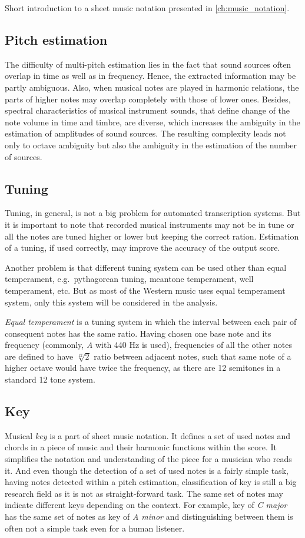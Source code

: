 Short introduction to a sheet music notation presented in \cref{ch:music_notation}.

\subsection{Pitch estimation}\label{subsec:pitch-estimation}
The difficulty of multi-pitch estimation lies in the fact that sound sources often overlap in time as well as in
frequency. Hence, the extracted information may be partly ambiguous. Also, when musical notes are played in harmonic
relations, the parts of higher notes may overlap completely with those of lower ones. Besides, spectral characteristics
of musical instrument sounds, that define change of the note volume in time and timbre, are diverse, which increases
the ambiguity in the estimation of amplitudes of sound sources. The resulting complexity leads not only to octave
ambiguity but also the ambiguity in the estimation of the number of sources.

\subsection{Tuning}\label{subsec:tuning}
Tuning, in general, is not a big problem for automated transcription systems. But it is important to note that recorded
musical instruments may not be in tune or all the notes are tuned higher or lower but keeping the correct ration.
Estimation of a tuning, if used correctly, may improve the accuracy of the output score.

Another problem is that different tuning system can be used other than equal temperament, e.g.\ pythagorean tuning,
meantone temperament, well temperament, etc. But as most of the Western music uses equal temperament system, only this
system will be considered in the analysis.

\textit{Equal temperament} is a tuning system in which the interval between each pair of consequent notes has the same
ratio. Having chosen one base note and its frequency (commonly, \textit{A} with 440 Hz is used), frequencies of all
the other notes are defined to have $\sqrt[12]{2}$ ratio between adjacent notes, such that same note of a higher octave
would have twice the frequency, as there are 12 semitones in a standard 12 tone system.


\subsection{Key}\label{subsec:key}
Musical \textit{key} is a part of sheet music notation. It defines a set of used notes and chords in a piece of music
and their harmonic functions within the score. It simplifies the notation and understanding of the piece for a musician
who reads it. And even though the detection of a set of used notes is a fairly simple task, having notes detected within
a pitch estimation, classification of key is still a big research field as it is not as straight-forward task. The same
set of notes may indicate different keys depending on the context. For example, key of \textit{C major} has the same
set of notes as key of \textit{A minor} and distinguishing between them is often not a simple task even for a human
listener.

